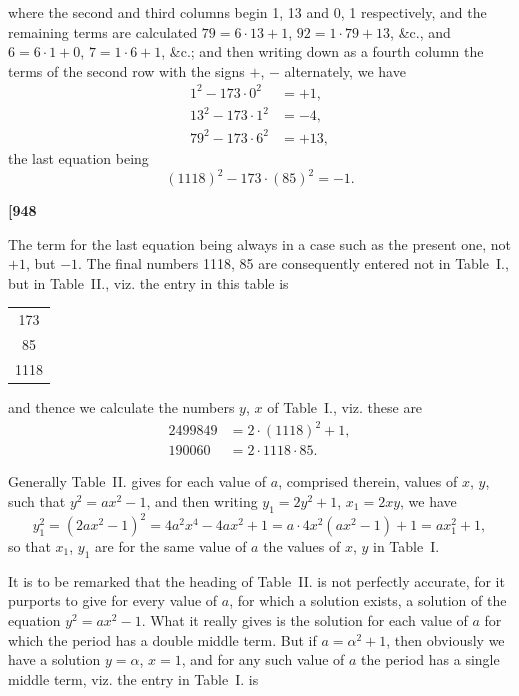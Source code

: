 \documentclass[12pt,a4paper]{article}
\begin{document}
where the second and third columns begin 1, 13 and 0, 1 respectively, and the remaining terms are calculated $79 = 6 \cdot 13 + 1$, $92 = 1 \cdot 79 + 13$, \&c., and $6 = 6 \cdot 1 + 0$, $7 = 1 \cdot 6 + 1$, \&c.; and then writing down as a fourth column the terms of the second row with the signs $+$, $-$ alternately, we have
\[
\begin{aligned}
1^{2} - 173 \cdot 0^{2} &= +1, \\
13^{2} - 173 \cdot 1^{2} &= -4, \\
79^{2} - 173 \cdot 6^{2} &= +13,
\end{aligned}
\]
the last equation being
\[ (1118)^{2} - 173 \cdot (85)^{2} = -1. \]

\newpage
\noindent\textbf{[948}

The term for the last equation being always in a case such as the present one, not $+1$, but $-1$. The final numbers 1118, 85 are consequently entered not in Table~I., but in Table~II., viz. the entry in this table is
\begin{center}
\begin{tabular}{c}
173 \\
85 \\
1118
\end{tabular}
\end{center}
and thence we calculate the numbers $y$, $x$ of Table~I., viz. these are
\[
\begin{aligned}
2499849 &= 2 \cdot (1118)^{2} + 1, \\
190060 &= 2 \cdot 1118 \cdot 85.
\end{aligned}
\]

Generally Table~II. gives for each value of $a$, comprised therein, values of $x$, $y$, such that $y^{2} = ax^{2} - 1$, and then writing $y_{1} = 2y^{2} + 1$, $x_{1} = 2xy$, we have
\[
y_{1}^{2} = (2ax^{2} - 1)^{2} = 4a^{2}x^{4} - 4ax^{2} + 1 = a \cdot 4x^{2}(ax^{2} - 1) + 1 = ax_{1}^{2} + 1,
\]
so that $x_{1}$, $y_{1}$ are for the same value of $a$ the values of $x$, $y$ in Table~I.

It is to be remarked that the heading of Table~II. is not perfectly accurate, for it purports to give for every value of $a$, for which a solution exists, a solution of the equation $y^{2} = ax^{2} - 1$. What it really gives is the solution for each value of $a$ for which the period has a double middle term. But if $a = \alpha^{2} + 1$, then obviously we have a solution $y = \alpha$, $x = 1$, and for any such value of $a$ the period has a single middle term, viz. the entry in Table~I. is
\end{document}
